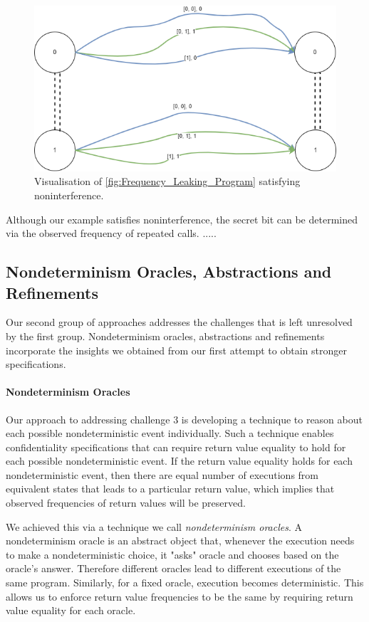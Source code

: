\begin{figure}[H]
    \centering
    \includegraphics[scale=0.5]{templates/figures/matching-paths.png}
    \caption{Visualisation of \ref{fig:Frequency_Leaking_Program} satisfying noninterference.}
    \label{fig:NI_Matching_Paths}
\end{figure}

Although our example satisfies noninterference, the secret bit can be determined via the observed frequency of repeated calls.
{\red .....}\\
\fi

\subsection{Nondeterminism Oracles, Abstractions and Refinements}
Our second group of approaches addresses the challenges that is left unresolved by the first group. Nondeterminism oracles, abstractions and refinements incorporate the insights we obtained from our first attempt to obtain stronger specifications.

\paragraph{Nondeterminism Oracles}
Our approach to addressing challenge 3 is developing a technique to reason about each possible nondeterministic event individually. Such a technique enables confidentiality specifications that can require return value equality to hold for each possible nondeterministic event. If the return value equality holds for each nondeterministic event, then there are equal number of executions from equivalent states that leads to a particular return value, which implies that observed frequencies of return values will be preserved.

We achieved this via a technique we call \emph{nondeterminism oracles}. A nondeterminism oracle is an abstract object that, whenever the execution needs to make a nondeterministic choice, it "asks" oracle and chooses based on the oracle's answer. Therefore different oracles lead to different executions of the same program. Similarly, for a fixed oracle, execution becomes deterministic. This allows us to enforce return value frequencies to be the same by requiring return value equality for each oracle.

